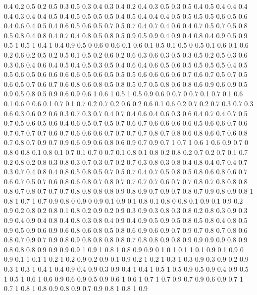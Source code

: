 0.4 0.2
0.5 0.2
0.5 0.3
0.5 0.3
0.4 0.3
0.4 0.2
0.4 0.3
0.5 0.3
0.5 0.4
0.5 0.4
0.4 0.4
0.4 0.3
0.4 0.4
0.5 0.4
0.5 0.5
0.5 0.5
0.4 0.5
0.4 0.4
0.4 0.5
0.5 0.5
0.5 0.6
0.5 0.6
0.4 0.6
0.4 0.5
0.4 0.6
0.5 0.6
0.5 0.7
0.5 0.7
0.4 0.7
0.4 0.6
0.4 0.7
0.5 0.7
0.5 0.8
0.5 0.8
0.4 0.8
0.4 0.7
0.4 0.8
0.5 0.8
0.5 0.9
0.5 0.9
0.4 0.9
0.4 0.8
0.4 0.9
0.5 0.9
0.5 1
0.5 1
0.4 1
0.4 0.9
0.5 0
0.6 0
0.6 0.1
0.6 0.1
0.5 0.1
0.5 0
0.5 0.1
0.6 0.1
0.6 0.2
0.6 0.2
0.5 0.2
0.5 0.1
0.5 0.2
0.6 0.2
0.6 0.3
0.6 0.3
0.5 0.3
0.5 0.2
0.5 0.3
0.6 0.3
0.6 0.4
0.6 0.4
0.5 0.4
0.5 0.3
0.5 0.4
0.6 0.4
0.6 0.5
0.6 0.5
0.5 0.5
0.5 0.4
0.5 0.5
0.6 0.5
0.6 0.6
0.6 0.6
0.5 0.6
0.5 0.5
0.5 0.6
0.6 0.6
0.6 0.7
0.6 0.7
0.5 0.7
0.5 0.6
0.5 0.7
0.6 0.7
0.6 0.8
0.6 0.8
0.5 0.8
0.5 0.7
0.5 0.8
0.6 0.8
0.6 0.9
0.6 0.9
0.5 0.9
0.5 0.8
0.5 0.9
0.6 0.9
0.6 1
0.6 1
0.5 1
0.5 0.9
0.6 0
0.7 0
0.7 0.1
0.7 0.1
0.6 0.1
0.6 0
0.6 0.1
0.7 0.1
0.7 0.2
0.7 0.2
0.6 0.2
0.6 0.1
0.6 0.2
0.7 0.2
0.7 0.3
0.7 0.3
0.6 0.3
0.6 0.2
0.6 0.3
0.7 0.3
0.7 0.4
0.7 0.4
0.6 0.4
0.6 0.3
0.6 0.4
0.7 0.4
0.7 0.5
0.7 0.5
0.6 0.5
0.6 0.4
0.6 0.5
0.7 0.5
0.7 0.6
0.7 0.6
0.6 0.6
0.6 0.5
0.6 0.6
0.7 0.6
0.7 0.7
0.7 0.7
0.6 0.7
0.6 0.6
0.6 0.7
0.7 0.7
0.7 0.8
0.7 0.8
0.6 0.8
0.6 0.7
0.6 0.8
0.7 0.8
0.7 0.9
0.7 0.9
0.6 0.9
0.6 0.8
0.6 0.9
0.7 0.9
0.7 1
0.7 1
0.6 1
0.6 0.9
0.7 0
0.8 0
0.8 0.1
0.8 0.1
0.7 0.1
0.7 0
0.7 0.1
0.8 0.1
0.8 0.2
0.8 0.2
0.7 0.2
0.7 0.1
0.7 0.2
0.8 0.2
0.8 0.3
0.8 0.3
0.7 0.3
0.7 0.2
0.7 0.3
0.8 0.3
0.8 0.4
0.8 0.4
0.7 0.4
0.7 0.3
0.7 0.4
0.8 0.4
0.8 0.5
0.8 0.5
0.7 0.5
0.7 0.4
0.7 0.5
0.8 0.5
0.8 0.6
0.8 0.6
0.7 0.6
0.7 0.5
0.7 0.6
0.8 0.6
0.8 0.7
0.8 0.7
0.7 0.7
0.7 0.6
0.7 0.7
0.8 0.7
0.8 0.8
0.8 0.8
0.7 0.8
0.7 0.7
0.7 0.8
0.8 0.8
0.8 0.9
0.8 0.9
0.7 0.9
0.7 0.8
0.7 0.9
0.8 0.9
0.8 1
0.8 1
0.7 1
0.7 0.9
0.8 0
0.9 0
0.9 0.1
0.9 0.1
0.8 0.1
0.8 0
0.8 0.1
0.9 0.1
0.9 0.2
0.9 0.2
0.8 0.2
0.8 0.1
0.8 0.2
0.9 0.2
0.9 0.3
0.9 0.3
0.8 0.3
0.8 0.2
0.8 0.3
0.9 0.3
0.9 0.4
0.9 0.4
0.8 0.4
0.8 0.3
0.8 0.4
0.9 0.4
0.9 0.5
0.9 0.5
0.8 0.5
0.8 0.4
0.8 0.5
0.9 0.5
0.9 0.6
0.9 0.6
0.8 0.6
0.8 0.5
0.8 0.6
0.9 0.6
0.9 0.7
0.9 0.7
0.8 0.7
0.8 0.6
0.8 0.7
0.9 0.7
0.9 0.8
0.9 0.8
0.8 0.8
0.8 0.7
0.8 0.8
0.9 0.8
0.9 0.9
0.9 0.9
0.8 0.9
0.8 0.8
0.8 0.9
0.9 0.9
0.9 1
0.9 1
0.8 1
0.8 0.9
0.9 0
1 0
1 0.1
1 0.1
0.9 0.1
0.9 0
0.9 0.1
1 0.1
1 0.2
1 0.2
0.9 0.2
0.9 0.1
0.9 0.2
1 0.2
1 0.3
1 0.3
0.9 0.3
0.9 0.2
0.9 0.3
1 0.3
1 0.4
1 0.4
0.9 0.4
0.9 0.3
0.9 0.4
1 0.4
1 0.5
1 0.5
0.9 0.5
0.9 0.4
0.9 0.5
1 0.5
1 0.6
1 0.6
0.9 0.6
0.9 0.5
0.9 0.6
1 0.6
1 0.7
1 0.7
0.9 0.7
0.9 0.6
0.9 0.7
1 0.7
1 0.8
1 0.8
0.9 0.8
0.9 0.7
0.9 0.8
1 0.8
1 0.9
